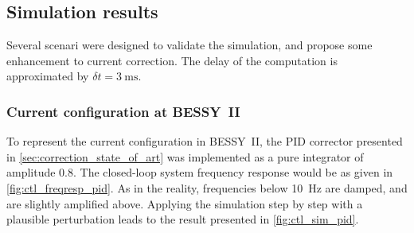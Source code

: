 \subsection{Simulation results}
Several scenari were designed to validate the simulation, and propose some enhancement to current correction. The delay of the computation is approximated by $\delta t = \SI{3}{\milli\second}$.
 
\subsubsection{Current configuration at BESSY~II}
To represent the current configuration in BESSY~II, the PID corrector presented in \cref{sec:correction_state_of_art} was implemented as a pure integrator of amplitude 0.8. The closed-loop system frequency response would be as given in \cref{fig:ctl_freqresp_pid}. As in the reality, frequencies below \SI{10}{\hertz} are damped, and are slightly amplified above. Applying the simulation step by step with a plausible perturbation leads to the result presented in \cref{fig:ctl_sim_pid}.

